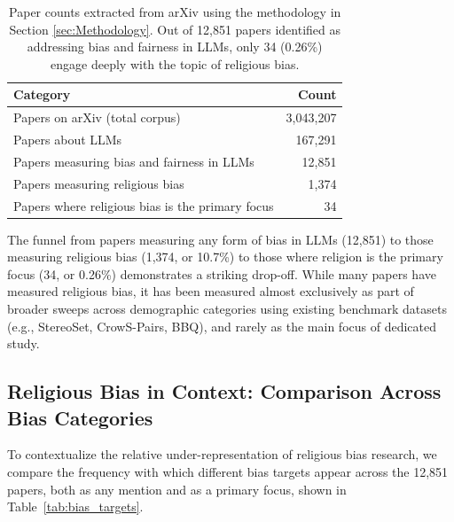 \documentclass[]{fairmeta}
\begin{document}
\begin{table}[htbp]
\centering
\caption{Paper counts extracted from arXiv using the methodology in Section \ref{sec:Methodology}. Out of 12,851 papers identified as addressing bias and fairness in LLMs, only 34 (0.26\%) engage deeply with the topic of religious bias.}
\label{tab:paper_counts}
\begin{tabular}{lr}
\toprule
\textbf{Category} & \textbf{Count} \\
\midrule
Papers on arXiv (total corpus) & 3,043,207 \\
Papers about LLMs & 167,291  \\
Papers measuring bias and fairness in LLMs & 12,851 \\
Papers measuring religious bias & 1,374 \\
Papers where religious bias is the primary focus & 34 \\
\bottomrule
\end{tabular}
\end{table}

The funnel from papers measuring any form of bias in LLMs (12,851) to those measuring religious bias (1,374, or 10.7\%) to those where religion is the primary focus (34, or 0.26\%) demonstrates a striking drop-off. While many papers have measured religious bias, it has been measured almost exclusively as part of broader sweeps across demographic categories using existing benchmark datasets (e.g., StereoSet, CrowS-Pairs, BBQ), and rarely as the main focus of dedicated study.

\subsection{Religious Bias in Context: Comparison Across Bias Categories}

To contextualize the relative under-representation of religious bias research, we compare the frequency with which different bias targets appear across the 12,851 papers, both as any mention and as a primary focus, shown in Table~\ref{tab:bias_targets}.
\end{document}
